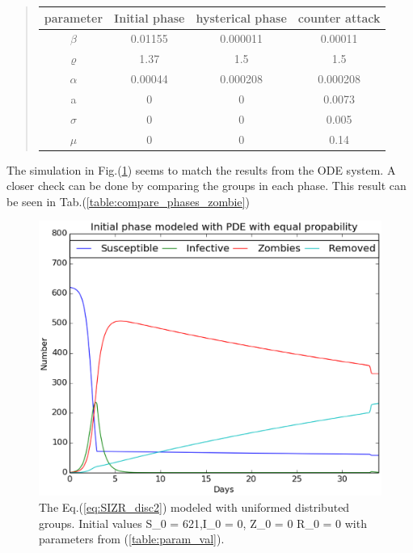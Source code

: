\documentclass[%
twoside,                 %
final,                   %
10pt]{article}
\begin{document}
\label{table:param_val}

\begin{quote}
\begin{tabular}{cccc}
\hline
\multicolumn{1}{c}{ parameter } & \multicolumn{1}{c}{ Initial phase } & \multicolumn{1}{c}{ hysterical phase } & \multicolumn{1}{c}{ counter attack } \\
\hline
$\beta$   & 0.01155       & 0.000011         & 0.00011        \\
$\varrho$ & 1.37          & 1.5              & 1.5            \\
$\alpha$  & 0.00044       & 0.000208         & 0.000208       \\
a         & 0             & 0                & 0.0073         \\
$\sigma$  & 0             & 0                & 0.005          \\
$\mu$     & 0             & 0                & 0.14           \\
\hline
\end{tabular}
\end{quote}

\noindent
The simulation in Fig.(\ref{fig:zombie_three_number}) seems to match the results from the ODE system. A closer check can be done by comparing the groups in each phase. This result can be seen in Tab.(\ref{table:compare_phases_zombie}) 


\begin{figure}[ht]
  \centerline{\includegraphics[width=0.8\linewidth]{plots/2D_zombie_three_phases_number.eps}}
  \caption{
  \label{fig:zombie_three_number} The Eq.(\ref{eq:SIZR_disc2}) modeled with uniformed distributed groups. Initial values S_0 = 621,I_0 = 0, Z_0 = 0 R_0 = 0 with parameters from (\ref{table:param_val}).
  }
\end{figure}
\end{document}
